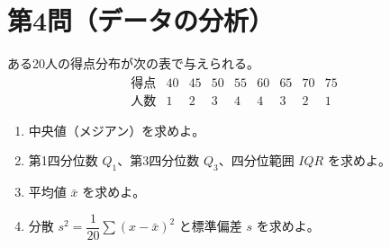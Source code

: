 \documentclass[a4paper,12pt]{jsarticle}
\begin{document}
\section*{第4問（データの分析）}
ある20人の得点分布が次の表で与えられる。
\[
\begin{array}{c|cccccccc}
\text{得点} & 40 & 45 & 50 & 55 & 60 & 65 & 70 & 75 \\ \hline
\text{人数} & 1 & 2 & 3 & 4 & 4 & 3 & 2 & 1
\end{array}
\]
\begin{enumerate}[label=\arabic*.]
  \item 中央値（メジアン）を求めよ。
  \item 第1四分位数 $Q_1$、第3四分位数 $Q_3$、四分位範囲 $IQR$ を求めよ。
  \item 平均値 $\bar{x}$ を求めよ。
  \item 分散 $s^2=\dfrac{1}{20}\sum (x-\bar{x})^2$ と標準偏差 $s$ を求めよ。
\end{enumerate}
\end{document}
